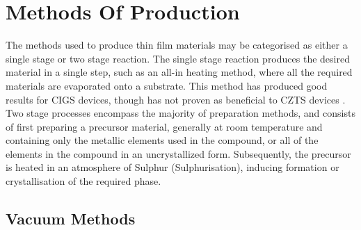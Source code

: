 \section{Methods Of Production}

The methods used to produce thin film materials may be categorised as either a single stage or two stage reaction. The single stage reaction produces the desired material in a single step, such as an all-in heating method, where all the required materials are evaporated onto a substrate. This method has produced good results for CIGS devices, though has not proven as beneficial to CZTS devices \citep{scragg2011copper}. Two stage processes encompass the majority of preparation methods, and consists of first preparing a precursor material, generally at room temperature and containing only the metallic elements used in the compound, or all of the elements in the compound in an uncrystallized form. Subsequently, the precursor is heated in an atmosphere of Sulphur (Sulphurisation), inducing formation or crystallisation of the required phase.

\subsection{Vacuum Methods}


